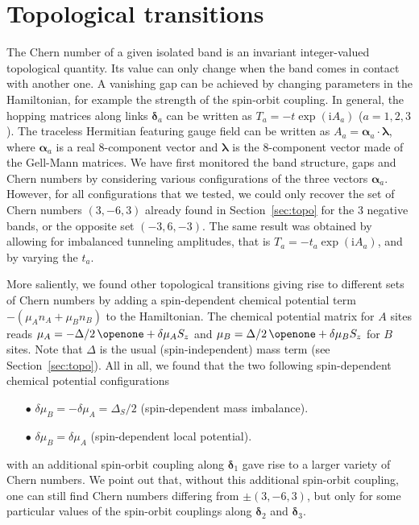 \documentclass[aps,pra,showpacs,twocolumn,superscriptaddress]{revtex4-1}
\newcommand{\imag}{\mathrm{i}}
\begin{document}
	
	

\section{Topological transitions}
\label{sec:transition}


The Chern number of a given isolated band is an invariant integer-valued topological quantity. 
Its value can only change when the band comes in contact with another one. A vanishing gap can 
be achieved by changing parameters in the Hamiltonian, for example the strength of the spin-orbit 
coupling. In general, the hopping matrices along links $\bm{\delta}_a$ can be written as 
$T_a = -t\exp{(\imag A_a)}$ ($a=1,2,3$). The traceless Hermitian featuring gauge field can
be written as $A_a=\bm{\alpha}_a\cdot\bm{\lambda}$, where $\bm{\alpha}_a$ is a real 
8-component vector and $\bm{\lambda}$ is the 8-component vector made of the Gell-Mann matrices. 
We have first monitored the band structure, gaps and Chern numbers by considering various 
configurations of the three vectors $\bm{\alpha}_a$. However, for all configurations that we 
tested, we could only recover the set of Chern numbers $(3,-6,3)$ already found in 
Section~\ref{sec:topo} for the 3 negative bands, or the opposite set $(-3,6,-3)$. 
The same result was obtained by allowing for imbalanced tunneling amplitudes, that is 
$T_a=-t_a\exp{(\imag A_a)}$, and by varying the $t_a$. 

More saliently, we found other topological transitions giving rise to different sets 
of Chern numbers by adding a spin-dependent chemical potential term $-(\mu_A n_A + \mu_B n_B)$ to the Hamiltonian. 
The chemical potential matrix for $A$ sites reads 
$\mu_A = -\Delta/2 \, \openone+\delta\mu_A S_z$ and 
$\mu_B = \Delta/2 \, \openone+\delta\mu_B S_z$ for $B$ sites. 
Note that $\Delta$ is the usual (spin-independent) mass term (see Section~\ref{sec:topo}).  
All in all, we found that the two following spin-dependent  chemical potential configurations
        \begin{itemize}
         \item[$\bullet$] $\delta\mu_B=-\delta\mu_A=\Delta_S/2$ (spin-dependent mass imbalance).
                        
         \item[$\bullet$] $\delta\mu_B=\delta\mu_A$ (spin-dependent local potential). 
         
        \end{itemize} 
with an additional spin-orbit coupling along $\bm{\delta}_1$ gave rise to a 
larger variety of Chern numbers. We point out that, without this additional spin-orbit coupling, 
one can still find Chern numbers differing from $\pm(3,-6,3)$, but only for some particular 
values of the spin-orbit couplings along $\bm{\delta}_2$ and $\bm{\delta}_3$.
        
\end{document}
